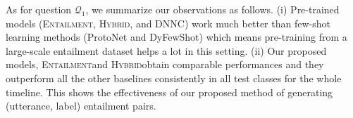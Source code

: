 \documentclass[11pt]{article}
\newcommand{\modelname}{\textsc{Entailment}}
\newcommand{\hybrid}{\textsc{Hybrid}}
\newcommand{\intentdata}{\textsc{IFS-Intent}}
\newcommand{\relationdata}{\textsc{IFS-Relation}}
\begin{document}


As for question $\mathcal{Q}_1$, we summarize our observations as follows. 
(i) Pre-trained models (\modelname, \hybrid, and DNNC) work much better than few-shot learning methods (ProtoNet and DyFewShot) which means pre-training from a large-scale entailment dataset helps a lot in this setting. (ii) Our proposed models, \modelname\enspace and \hybrid\enspace obtain comparable performances and they outperform all the other baselines consistently in all test classes for the whole timeline. This shows the effectiveness of our proposed method of generating (utterance, label) entailment pairs.

\end{document}
